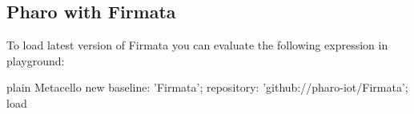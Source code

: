 \documentclass[10pt,twoside,english]{_support/latex/sbabook/sbabook}
\begin{document}
\subsection{Pharo with Firmata}
To load latest version of Firmata you can evaluate the following expression in playground:

\begin{displaycode}{plain}
  Metacello new
  baseline: 'Firmata';
  repository: 'github://pharo-iot/Firmata';
  load
\end{displaycode}






\backmatter

\end{document}
